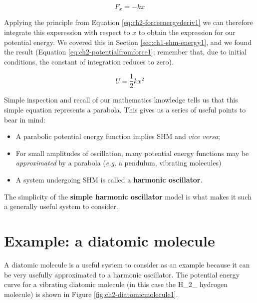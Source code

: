 \documentclass[
]{book}
\providecommand{\tightlist}{%
  \setlength{\itemsep}{0pt}\setlength{\parskip}{0pt}}
\begin{document}
\begin{equation}
F_x = -kx
\label{eq:ch2-hookeslaw1}
\end{equation}

Applying the principle from Equation \eqref{eq:ch2-forceenergyderiv1} we can therefore integrate this experession with respect to \(x\) to obtain the expression for our potential energy. We covered this in Section \ref{sec:ch1-shm-energy1}, and we found the result (Equation \eqref{eq:ch2-potentialfromforce1}; remember that, due to initial conditions, the constant of integration reduces to zero).

\begin{equation}
U  = \frac{1}{2}kx^2 
\label{eq:ch2-potentialfromforce1}
\end{equation}

Simple inspection and recall of our mathematics knowledge tells us that this simple equation represents a parabola. This gives us a series of useful points to bear in mind:

\begin{itemize}
\tightlist
\item
  A parabolic potential energy function implies SHM and \emph{vice versa};
\item
  For small amplitudes of oscillation, many potential energy functions may be \emph{approximated} by a parabola (\emph{e.g.} a pendulum, vibrating molecules)
\item
  A system undergoing SHM is called a \textbf{harmonic oscillator}.
\end{itemize}

The simplicity of the \textbf{simple harmonic oscillator} model is what makes it such a generally useful system to consider.

\hypertarget{sec:ch2-diatomicmolecule}{%
\section{Example: a diatomic molecule}\label{sec:ch2-diatomicmolecule}}

A diatomic molecule is a useful system to consider as an example because it can be very usefully approximated to a harmonic oscillator. The potential energy curve for a vibrating diatomic molecule (in this case the H\_2\_ hydrogen molecule) is shown in Figure \ref{fig:ch2-diatomicmolecule1}.
\end{document}
